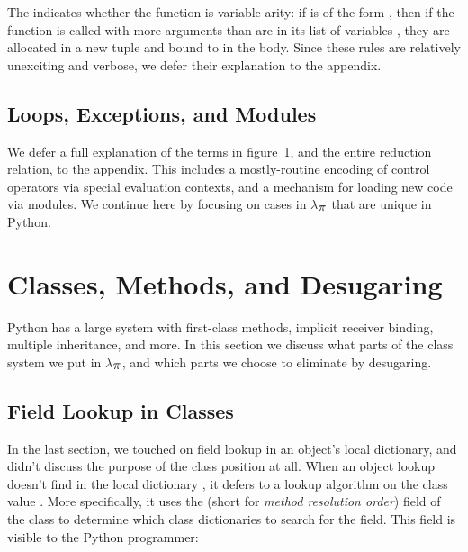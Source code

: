 \documentclass[10pt]{sigplanconf}
\newcommand{\sectionNewpage}{}
\newcommand{\textsub}[1]{$_{\hbox{\textsmaller{#1}}}$}
\newcommand{\Larger}[1]{\textlarger{#1}}
\newenvironment{SCentered}{\begin{trivlist}\item \centering}{\end{trivlist}}
\let\SOriginalthesubsection\thesubsection
\let\SOriginalthesubsubsection\thesubsubsection
\newcommand{\Ssection}[2]{\section[#1]{#2}\let\thesubsection\SOriginalthesubsection}
\newcommand{\Ssubsection}[2]{\subsection[#1]{#2}\let\thesubsubsection\SOriginalthesubsubsection}
\newcommand{\FigureRef}[2]{#1}
\begin{document}
\begin{SCentered}\end{SCentered}

The  indicates whether the function is variable{-}arity:
if  is of the form ,
then if the function is called with more arguments than are in its list of
variables , they are allocated in a new tuple and bound to
 in the body.  Since these rules are relatively unexciting and verbose, we defer their explanation to the appendix.

\Ssubsection{Loops, Exceptions, and Modules}{Loops, Exceptions, and Modules}\label{t:x28part_x22Loopsx5fx5fExceptionsx5fx5fandx5fModulesx22x29}

We defer a full explanation of the terms in figure~\FigureRef{1}{t:x28counter_x28x22figurex22_x22fx3aexprsx22x29x29}, and the
entire reduction relation, to the appendix.  This includes a mostly{-}routine
encoding of control operators via special evaluation contexts, and a mechanism
for loading new code via modules.  We continue here by focusing on
cases in $\lambda$\textsub{\Larger{$\pi$}} that are unique in Python.

\sectionNewpage

\Ssection{Classes, Methods, and Desugaring}{Classes, Methods, and Desugaring}\label{t:x28part_x22sx3aclassesx22x29}

Python has a large system with first{-}class methods, implicit
receiver binding, multiple inheritance, and more.  In this section we discuss
what parts of the class system we put in $\lambda$\textsub{\Larger{$\pi$}}, and which parts
we choose to eliminate by desugaring.

\Ssubsection{Field Lookup in Classes}{Field Lookup in Classes}\label{t:x28part_x22Fieldx5fLookupx5finx5fClassesx22x29}

In the last section, we touched on field lookup in an object{'}s local
dictionary, and didn{'}t discuss the purpose of the class position at all.
When an object lookup 
doesn{'}t find  in the local dictionary , it defers
to a lookup algorithm on the class value .  More
specifically, it uses the  (short for \textit{method
resolution order}) field of the class to
determine which class dictionaries to search for the field.  This field is
visible to the Python programmer:
\end{document}
